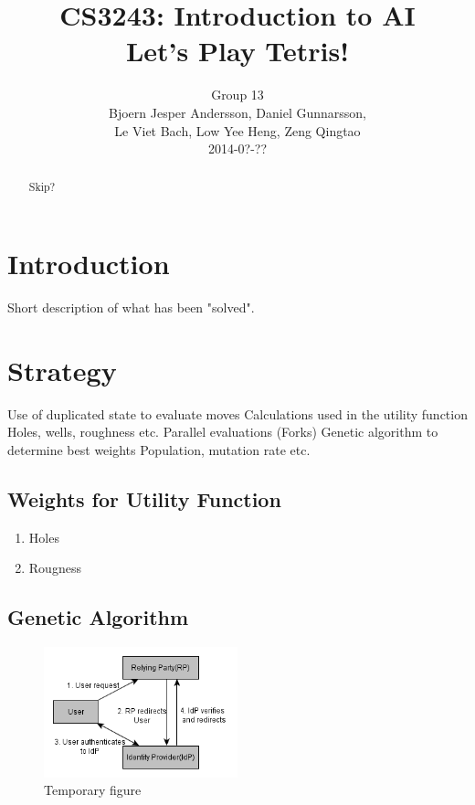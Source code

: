 \documentclass[twocolumn,12pt,journal]{IEEEtran}
\begin{document}
\title{CS3243: Introduction to AI\\ Let’s Play Tetris! }

\author{
  Group 13 \\
  Bjoern Jesper Andersson, Daniel Gunnarsson, \\Le Viet Bach, Low Yee Heng, Zeng Qingtao\\ 
  2014-0?-?? 
}

\maketitle

\begin{abstract}
    Skip?
\end{abstract}

\section{Introduction} 
Short description of what has been "solved".

\section{Strategy} 
    Use of duplicated state to evaluate moves
    Calculations used in the utility function
        Holes, wells, roughness etc.
    Parallel evaluations (Forks)
    Genetic algorithm to determine best weights
        Population, mutation rate etc.

\subsection{Weights for Utility Function}
\begin{enumerate}
    \item Holes
    \item Rougness
\end{enumerate}
\subsection{Genetic Algorithm}




\begin{figure}[h]
  \centering
    \includegraphics[width=0.5\textwidth]{Picture.png}
  \caption{Temporary figure}
  \label{fig:SSOFlow}
\end{figure}
\end{document}
